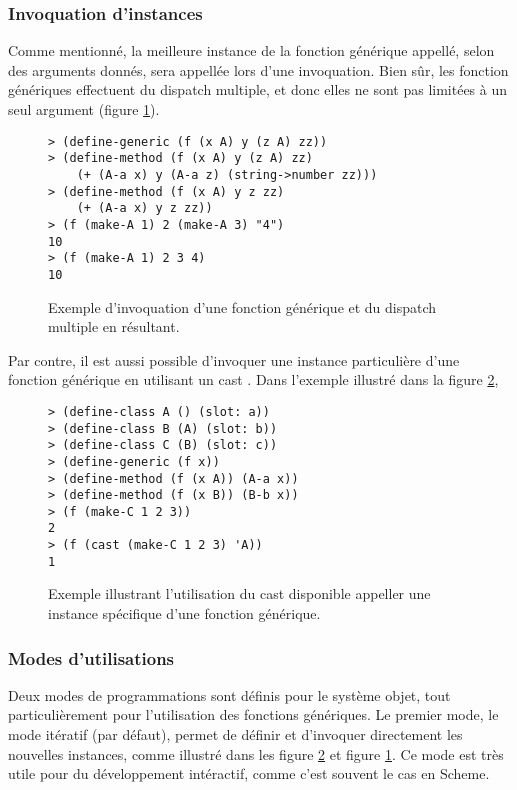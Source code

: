       \subsubsection{Invoquation d'instances}

        Comme mentionné, la meilleure instance de la fonction
        générique appellé, selon des arguments donnés, sera appellée
        lors d'une invoquation. Bien sûr, les fonction génériques
        effectuent du \og dispatch \fg multiple, et donc elles ne sont
        pas limitées à un seul argument (figure \ref{ex-multdisp}).

        \begin{figure}[h!]
          \begin{lstlisting}
> (define-generic (f (x A) y (z A) zz))
> (define-method (f (x A) y (z A) zz)
    (+ (A-a x) y (A-a z) (string->number zz)))
> (define-method (f (x A) y z zz)
    (+ (A-a x) y z zz))
> (f (make-A 1) 2 (make-A 3) "4")
10
> (f (make-A 1) 2 3 4)
10
          \end{lstlisting}
          \caption{Exemple d'invoquation d'une fonction générique et
            du \og dispatch \fg multiple en résultant.}
          \label{ex-multdisp}
        \end{figure}
        
        Par contre, il est aussi possible d'invoquer une instance
        particulière d'une fonction générique en utilisant un \og cast
        \fg. Dans l'exemple illustré dans la figure \ref{ex-cast},

        \begin{figure}[h!]
          \begin{lstlisting}
> (define-class A () (slot: a))
> (define-class B (A) (slot: b))
> (define-class C (B) (slot: c))
> (define-generic (f x))
> (define-method (f (x A)) (A-a x))
> (define-method (f (x B)) (B-b x))
> (f (make-C 1 2 3))
2
> (f (cast (make-C 1 2 3) 'A))
1
          \end{lstlisting}
          \caption{Exemple illustrant l'utilisation du \og cast \fg
            disponible appeller une instance spécifique d'une fonction
            générique.}
          \label{ex-cast}
        \end{figure}

      \subsubsection{Modes d'utilisations}

        Deux modes de programmations sont définis pour le système
        objet, tout particulièrement pour l'utilisation des fonctions
        génériques. Le premier mode, le mode itératif (par défaut),
        permet de définir et d'invoquer directement les nouvelles
        instances, comme illustré dans les figure \ref{ex-cast} et
        figure \ref{ex-multdisp}. Ce mode est très utile pour du
        développement intéractif, comme c'est souvent le cas en
        Scheme. 

